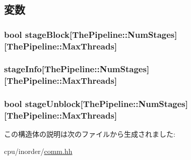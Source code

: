\subsection{変数}
\hypertarget{structTimeStruct_ae069373288f1db6733df453a1bced9fe}{
\subsubsection[{stageBlock}]{\setlength{\rightskip}{0pt plus 5cm}bool {\bf stageBlock}\mbox{[}{\bf ThePipeline::NumStages}\mbox{]}\mbox{[}{\bf ThePipeline::MaxThreads}\mbox{]}}}
\label{structTimeStruct_ae069373288f1db6733df453a1bced9fe}
\hypertarget{structTimeStruct_ada7f35cbafe48bd5f738dcb0dc017cc2}{
\subsubsection[{stageInfo}]{ {\bf stageInfo}\mbox{[}{\bf ThePipeline::NumStages}\mbox{]}\mbox{[}{\bf ThePipeline::MaxThreads}\mbox{]}}}
\label{structTimeStruct_ada7f35cbafe48bd5f738dcb0dc017cc2}
\hypertarget{structTimeStruct_ac034ecec18e28c5cc261ce877e429418}{
\subsubsection[{stageUnblock}]{\setlength{\rightskip}{0pt plus 5cm}bool {\bf stageUnblock}\mbox{[}{\bf ThePipeline::NumStages}\mbox{]}\mbox{[}{\bf ThePipeline::MaxThreads}\mbox{]}}}
\label{structTimeStruct_ac034ecec18e28c5cc261ce877e429418}


この構造体の説明は次のファイルから生成されました:\begin{DoxyCompactItemize}
\item 
cpu/inorder/\hyperlink{inorder_2comm_8hh}{comm.hh}\end{DoxyCompactItemize}
